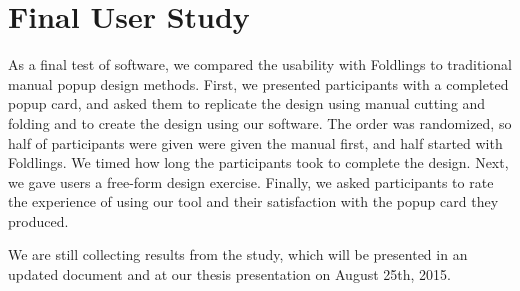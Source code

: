 \section{Final User Study}\label{final-user-study}

As a final test of software, we compared the usability with Foldlings to
traditional manual popup design methods. First, we presented
participants with a completed popup card, and asked them to replicate
the design using manual cutting and folding and to create the design
using our software. The order was randomized, so half of participants
were given were given the manual first, and half started with Foldlings.
We timed how long the participants took to complete the design. Next, we
gave users a free-form design exercise. Finally, we asked participants
to rate the experience of using our tool and their satisfaction with the
popup card they produced.

We are still collecting results from the study, which will be presented
in an updated document and at our thesis presentation on August 25th,
2015.
